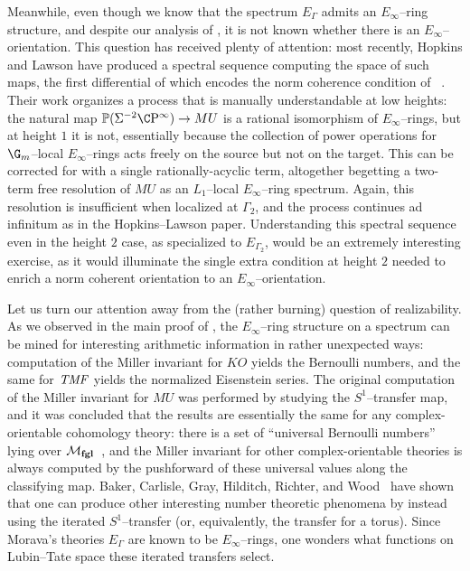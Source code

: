 Meanwhile, even though we know that the spectrum \(E_\Gamma\) admits an \(E_\infty\)--ring structure, and despite our analysis of , it is not known whether there is an \(E_\infty\)--orientation.
This question has received plenty of attention: most recently, Hopkins and Lawson have produced a spectral sequence computing the space of such maps, the first differential of which encodes the norm coherence condition of ~\cite{HopkinsLawson}.
Their work organizes a process that is manually understandable at low heights: the natural map \(\mathbb P(\Susp^{-2} \CP^\infty) \to MU\) is a rational isomorphism of \(E_\infty\)--rings, but at height \(1\) it is not, essentially because the collection of power operations for \(\G_m\)--local \(E_\infty\)--rings acts freely on the source but not on the target.
This can be corrected for with a single rationally-acyclic term, altogether begetting a two-term free resolution of \(MU\) as an \(L_1\)--local \(E_\infty\)--ring spectrum.
Again, this resolution is insufficient when localized at \(\Gamma_2\), and the process continues ad infinitum as in the Hopkins--Lawson paper.
Understanding this spectral sequence even in the height \(2\) case, as specialized to \(E_{\Gamma_2}\), would be an extremely interesting exercise, as it would illuminate the single extra condition at height \(2\) needed to enrich a norm coherent orientation to an \(E_\infty\)--orientation.







Let us turn our attention away from the (rather burning) question of realizability.
As we observed in the main proof of , the \(E_\infty\)--ring structure on a spectrum can be mined for interesting arithmetic information in rather unexpected ways: computation of the Miller invariant for \(KO\) yields the Bernoulli numbers, and the same for \(\mathit{TMF}\) yields the normalized Eisenstein series.
The original computation of the Miller invariant for \(MU\) was performed by studying the \(S^1\)--transfer map, and it was concluded that the results are essentially the same for any complex-orientable cohomology theory: there is a set of ``universal Bernoulli numbers'' lying over \(\mathcal{M}_{\mathbf{fgl}}\)~\cite{MillerBernoulliNos}, and the Miller invariant for other complex-orientable theories is always computed by the pushforward of these universal values along the classifying map.
Baker, Carlisle, Gray, Hilditch, Richter, and Wood~\cite{BCGHRW} have shown that one can produce other interesting number theoretic phenomena by instead using the iterated \(S^1\)--transfer (or, equivalently, the transfer for a torus).
Since Morava's theories \(E_\Gamma\) are known to be \(E_\infty\)--rings, one wonders what functions on Lubin--Tate space these iterated transfers select.

